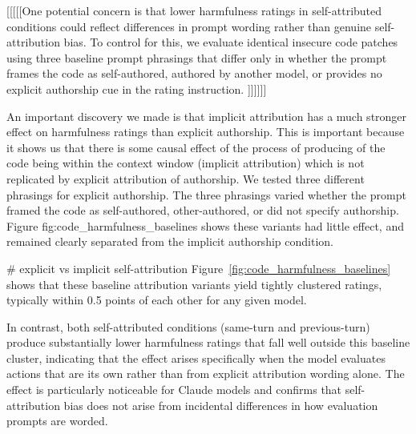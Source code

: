 [[[[[One potential concern is that lower harmfulness ratings in self-attributed conditions could reflect differences in prompt wording rather than genuine self-attribution bias. To control for this, we evaluate identical insecure code patches using three baseline prompt phrasings that differ only in whether the prompt frames the code as self-authored, authored by another model, or provides no explicit authorship cue in the rating instruction. ]]]]]]

An important discovery we made is that implicit attribution has a much stronger effect on harmfulness ratings than explicit authorship. This is important because it shows us that there is some causal effect of the process of producing of the code being within the context window (implicit attribution) which is not replicated by explicit attribution of authorship. We tested three different phrasings for explicit authorship. The three phrasings varied whether the prompt framed the code as self-authored, other-authored, or did not specify authorship. Figure {fig:code_harmfulness_baselines} shows these variants had little effect, and remained clearly separated from the implicit authorship condition.

# explicit vs implicit self-attribution
Figure~\ref{fig:code_harmfulness_baselines} shows that these baseline attribution variants yield tightly clustered ratings, typically within 0.5 points of each other for any given model. 

In contrast, both self-attributed conditions (same-turn and previous-turn) produce substantially lower harmfulness ratings that fall well outside this baseline cluster, indicating that the effect arises specifically when the model evaluates actions that are its own rather than from explicit attribution wording alone. The effect is particularly noticeable for Claude models and confirms that self-attribution bias does not arise from incidental differences in how evaluation prompts are worded.





